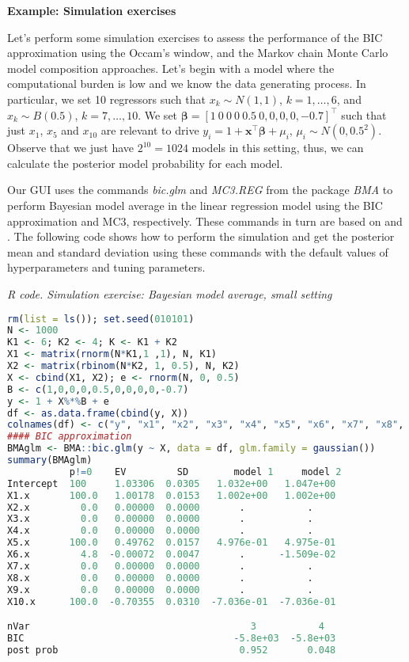 \textbf{Example: Simulation exercises}

Let's perform some simulation exercises to assess the performance of the BIC approximation using the Occam's window, and the Markov chain Monte Carlo model composition approaches. Let's begin with a model where the computational burden is low and we know the data generating process. In particular, we set 10 regressors such that $x_k\sim N(1, 1)$, $k =1,\dots,6$, and $x_k\sim B(0.5)$, $k=7,\dots,10$. We set $\bm{\beta}=[1 \ 0 \ 0 \ 0 \ 0.5 \ 0, 0, 0, 0, -0.7]^{\top}$ such that just $x_1$, $x_5$ and $x_{10}$ are relevant to drive $y_i=1+\bm{x}^{\top}\bm{\beta}+\mu_i$, $\mu_i\sim N(0,0.5^2)$. Observe that we just have $2^{10}=1024$ models in this setting, thus, we can calculate the posterior model probability for each model. 

Our GUI uses the commands \textit{bic.glm} and \textit{MC3.REG} from the package \textit{BMA} to perform Bayesian model average in the linear regression model using the BIC approximation and MC3, respectively. These commands in turn are based on \cite{Raftery1995} and \cite{Raftery1997}. The following code shows how to perform the simulation and get the posterior mean and standard deviation using these commands with the default values of hyperparameters and tuning parameters.

\begin{tcolorbox}[enhanced,width=4.67in,center upper,
	fontupper=\large\bfseries,drop shadow southwest,sharp corners]
	\textit{R code. Simulation exercise: Bayesian model average, small setting}
	\begin{VF}
		\begin{lstlisting}[language=R]
rm(list = ls()); set.seed(010101)
N <- 1000
K1 <- 6; K2 <- 4; K <- K1 + K2
X1 <- matrix(rnorm(N*K1,1 ,1), N, K1)
X2 <- matrix(rbinom(N*K2, 1, 0.5), N, K2)
X <- cbind(X1, X2); e <- rnorm(N, 0, 0.5)
B <- c(1,0,0,0,0.5,0,0,0,0,-0.7)
y <- 1 + X%*%B + e
df <- as.data.frame(cbind(y, X)) 
colnames(df) <- c("y", "x1", "x2", "x3", "x4", "x5", "x6", "x7", "x8", "x9", "x10")
#### BIC approximation
BMAglm <- BMA::bic.glm(y ~ X, data = df, glm.family = gaussian()) 
summary(BMAglm)
           p!=0    EV         SD        model 1     model 2   
Intercept  100     1.03306  0.0305   1.032e+00   1.047e+00
X1.x       100.0   1.00178  0.0153   1.002e+00   1.002e+00
X2.x         0.0   0.00000  0.0000       .           .    
X3.x         0.0   0.00000  0.0000       .           .    
X4.x         0.0   0.00000  0.0000       .           .    
X5.x       100.0   0.49762  0.0157   4.976e-01   4.975e-01
X6.x         4.8  -0.00072  0.0047       .      -1.509e-02
X7.x         0.0   0.00000  0.0000       .           .    
X8.x         0.0   0.00000  0.0000       .           .    
X9.x         0.0   0.00000  0.0000       .           .    
X10.x      100.0  -0.70355  0.0310  -7.036e-01  -7.036e-01

nVar                                       3           4      
BIC                                     -5.8e+03  -5.8e+03
post prob                                0.952       0.048
\end{lstlisting}
	\end{VF}
\end{tcolorbox} 

